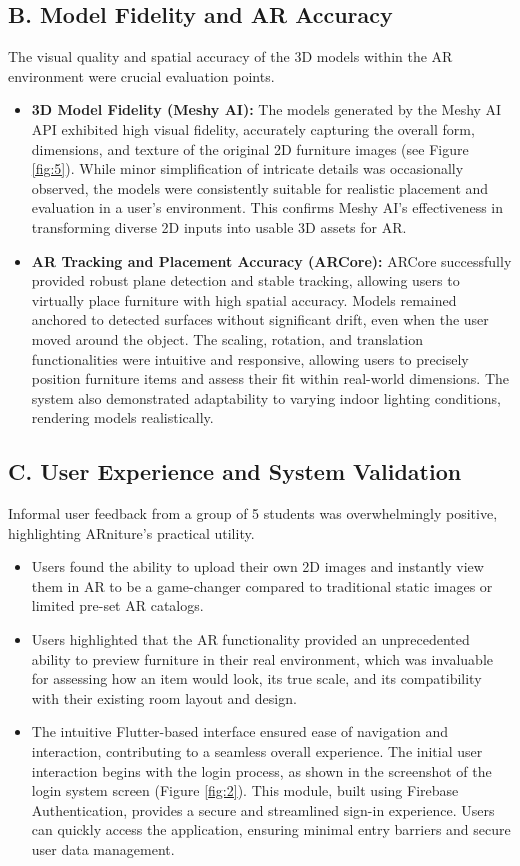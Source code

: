 \documentclass[12pt, a4paper]{article}
\begin{document}
\subsection{B. Model Fidelity and AR Accuracy}
The visual quality and spatial accuracy of the 3D models within the AR environment were crucial evaluation points.
\begin{itemize}
  \item \textbf{3D Model Fidelity (Meshy AI):} The models generated by the Meshy AI API exhibited high visual fidelity, accurately capturing the overall form, dimensions, and texture of the original 2D furniture images (see Figure \ref{fig:5}). While minor simplification of intricate details was occasionally observed, the models were consistently suitable for realistic placement and evaluation in a user's environment. This confirms Meshy AI's effectiveness in transforming diverse 2D inputs into usable 3D assets for AR.
  \item \textbf{AR Tracking and Placement Accuracy (ARCore):} ARCore successfully provided robust plane detection and stable tracking, allowing users to virtually place furniture with high spatial accuracy. Models remained anchored to detected surfaces without significant drift, even when the user moved around the object. The scaling, rotation, and translation functionalities were intuitive and responsive, allowing users to precisely position furniture items and assess their fit within real-world dimensions. The system also demonstrated adaptability to varying indoor lighting conditions, rendering models realistically.
\end{itemize}

\subsection{C. User Experience and System Validation}
Informal user feedback from a group of 5 students was overwhelmingly positive, highlighting ARniture's practical utility.
\begin{itemize}
  \item Users found the ability to upload their own 2D images and instantly view them in AR to be a game-changer compared to traditional static images or limited pre-set AR catalogs.
  \item Users highlighted that the AR functionality provided an unprecedented ability to preview furniture in their real environment, which was invaluable for assessing how an item would look, its true scale, and its compatibility with their existing room layout and design.
  \item The intuitive Flutter-based interface ensured ease of navigation and interaction, contributing to a seamless overall experience. The initial user interaction begins with the login process, as shown in the screenshot of the login system screen (Figure \ref{fig:2}). This module, built using Firebase Authentication, provides a secure and streamlined sign-in experience. Users can quickly access the application, ensuring minimal entry barriers and secure user data management.
\end{itemize}
\end{document}
